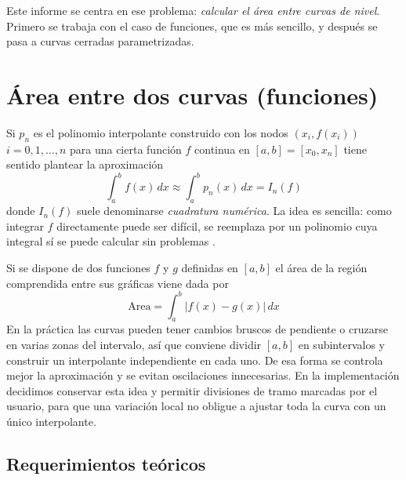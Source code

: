 \documentclass[12pt]{article}
\begin{document}
Este informe se centra en ese problema: \textit{calcular el área entre curvas de nivel}. Primero se trabaja con el caso de funciones, que es más sencillo, y después se pasa a curvas cerradas parametrizadas.

\section*{Área entre dos curvas (funciones)}

Si $p_n$ es el polinomio interpolante construido con los nodos $(x_i, f(x_i))$ $i=0,1,\ldots,n$ para una cierta función $f$ continua en $[a,b] = [x_0,x_n]$ tiene sentido plantear la aproximación
\[
\int_a^b f(x)\,dx \approx \int_a^b p_n(x)\,dx = I_n(f)
\]
donde $I_n(f)$ suele denominarse \textit{cuadratura numérica}. La idea es sencilla: como integrar $f$ directamente puede ser difícil, se reemplaza por un polinomio cuya integral sí se puede calcular sin problemas \cite{cheney08}.

Si se dispone de dos funciones $f$ y $g$ definidas en $[a,b]$ el área de la región comprendida entre sus gráficas viene dada por
\[
\text{Area} = \int_a^b |f(x) - g(x)|\,dx
\]
En la práctica las curvas pueden tener cambios bruscos de pendiente o cruzarse en varias zonas del intervalo, así que conviene dividir $[a,b]$ en subintervalos y construir un interpolante independiente en cada uno. De esa forma se controla mejor la aproximación y se evitan oscilaciones innecesarias. En la implementación decidimos conservar esta idea y permitir divisiones de tramo marcadas por el usuario, para que una variación local no obligue a ajustar toda la curva con un único interpolante.

\subsection*{Requerimientos teóricos}
\end{document}

